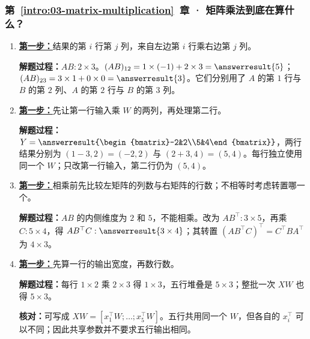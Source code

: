 \subsubsection*{第~\ref*{intro:03-matrix-multiplication}~章 · 矩阵乘法到底在算什么？}
\begin{enumerate}[label={},leftmargin=4.8em,itemsep=4pt]
\item[\textbf{C-028.}] \leavevmode{}\label{solution:C-028}\label{solution:matrix-single-entry}\hyperref[exercise:matrix-single-entry]{\textbf{第一步：}}结果的第 $i$ 行第 $j$ 列，来自左边第 $i$ 行乘右边第 $j$ 列。\par\nobreak
\textbf{解题过程：}$AB:2\times3$。$(AB)_{12}=1\times(-1)+2\times3=\answerresult{5}$；$(AB)_{23}=3\times1+0\times0=\answerresult{3}$。它们分别用了 $A$ 的第 $1$ 行与 $B$ 的第 $2$ 列、$A$ 的第 $2$ 行与 $B$ 的第 $3$ 列。
\item[\textbf{C-029.}] \leavevmode{}\label{solution:C-029}\label{solution:matrix-batch-calculation}\hyperref[exercise:matrix-batch-calculation]{\textbf{第一步：}}先让第一行输入乘 $W$ 的两列，再处理第二行。\par\nobreak
\textbf{解题过程：}$Y=\answerresult{\begin{bmatrix}-2&2\\5&4\end{bmatrix}}$，两行结果分别为 $(1-3,2)=(-2,2)$ 与 $(2+3,4)=(5,4)$。每行独立使用同一个 $W$；只改第一行输入，第二行仍为 $(5,4)$。
\item[\textbf{C-030.}] \leavevmode{}\label{solution:C-030}\label{solution:matrix-shape-correction}\hyperref[exercise:matrix-shape-correction]{\textbf{第一步：}}相乘前先比较左矩阵的列数与右矩阵的行数；不相等时考虑转置哪一个。\par\nobreak
\textbf{解题过程：}$AB$ 的内侧维度为 $2$ 和 $5$，不能相乘。改为 $AB^\top:3\times5$，再乘 $C:5\times4$，得 $AB^\top C:\answerresult{3\times4}$；其转置 $(AB^\top C)^\top=C^\top BA^\top$ 为 $4\times3$。
\item[\textbf{C-031.}] \leavevmode{}\label{solution:C-031}\label{solution:batch-matrix-sharing}\hyperref[exercise:batch-matrix-sharing]{\textbf{第一步：}}先算一行的输出宽度，再数行数。\par\nobreak\textbf{解题过程：}每行 $1\times2$ 乘 $2\times3$ 得 $1\times3$，五行堆叠是 $5\times3$；整批一次 $XW$ 也得 $5\times3$。\par\textbf{核对：}可写成 $XW=[x_1^\top W;\ldots;x_5^\top W]$。五行共用同一个 $W$，但各自的 $x_i^\top$ 可以不同；因此共享参数并不要求五行输出相同。

\end{enumerate}
